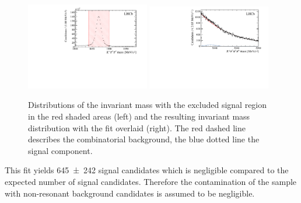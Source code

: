 \begin{figure}[tb]
    \centering
    \includegraphics[width=0.48\textwidth]{07selection/figs/DmassCut.pdf}
    \includegraphics[width=0.48\textwidth]{07selection/figs/Resulting_Bmass.pdf}
    \caption{Distributions of the invariant \Dm mass with the excluded signal region in the red shaded areas (left) and the resulting invariant \Bz mass distribution with the fit overlaid (right). The red dashed line describes the combinatorial background, the blue dotted line the signal component.}
    \label{fig:nonRes_Try2}
\end{figure}
This fit yields \num{645\pm242} signal candidates which is negligible compared to the expected number of \BdToDpi signal candidates.
Therefore the contamination of the sample with non-resonant background candidates is assumed to be negligible.
